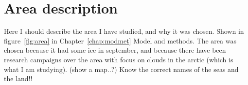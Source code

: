 \section{Area description}
Here I should describe the area I have studied, and why it was chosen. Shown in figure~\ref{fig:area} in Chapter~\ref{chap:modmet} Model and methods.
The area was chosen because it had some ice in september, and because there have been research campaigns over the area with focus on clouds in the arctic (which is what I am studying). (show a map..?) Know the correct names of the seas and the land!!
